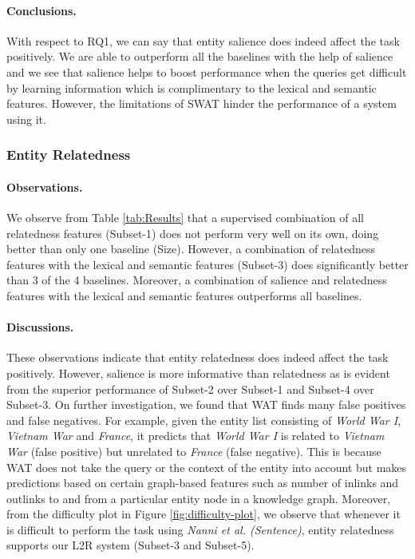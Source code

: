 \paragraph{\textbf{Conclusions.}}
With respect to RQ1, we can say that entity salience does indeed affect the task positively. We are able to outperform all the baselines with the help of salience and we see that salience helps to boost performance when the queries get difficult by learning information which is complimentary to the lexical and semantic features. However, the limitations of SWAT hinder the performance of a system using it.


\subsubsection{Entity Relatedness}
\label{subsubsec:Entity Relatedness}
\paragraph{\textbf{Observations.}}
We observe from Table \ref{tab:Results} that a supervised combination of all relatedness features (Subset-1) does not perform very well on its own, doing better than only one baseline (Size). However, a combination of relatedness features with the lexical and semantic features (Subset-3) does significantly better than 3 of the 4 baselines. Moreover, a combination of salience and relatedness features with the lexical and semantic features outperforms all baselines. 
\paragraph{\textbf{Discussions.}}
These observations indicate that entity relatedness does indeed affect the task positively. However, salience is more informative than relatedness as is evident from the superior performance of Subset-2 over Subset-1 and Subset-4 over Subset-3. On further investigation, we found that WAT finds many false positives and false negatives. For example, given the entity list consisting of  \textit{World War I}, \textit{Vietnam War} and \textit{France}, it predicts that \textit{World War I} is related to \textit{Vietnam War} (false positive) but  unrelated to \textit{France} (false negative). This is because WAT does not take
the query or the context of the entity into account but makes predictions based on certain graph-based features such as number of inlinks and outlinks to and
from a particular entity node in a knowledge graph. Moreover, from the difficulty plot in Figure \ref{fig:difficulty-plot}, we observe that whenever it is difficult to perform the task using \textit{Nanni et al. (Sentence)}, entity relatedness supports our L2R system (Subset-3 and Subset-5).


